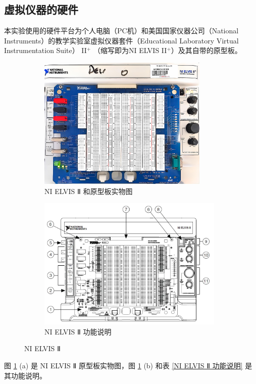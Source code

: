 \documentclass[UTF8]{article}
\theoremstyle{MyLineTheoremStyle} %
\theoremstyle{MyBlockTheoremStyle} %
\theoremstyle{MySubsubsectionStyle} %
\begin{document}
\subsection{虚拟仪器的硬件}
本实验使用的硬件平台为个人电脑（PC机）和美国国家仪器公司（National Instruments）的教学实验室虚拟仪器套件（Educational Laboratory Virtual Instrumentation Suite） II$ ^+ $ （缩写即为NI ELVIS II$ ^+ $）及其自带的原型板。
\begin{figure}[H]\centering
\begin{subfigure}[t]{0.47\columnwidth}\centering
    \includegraphics[height=180pt]{assets/NI ELVIS 2 和原型板实物图.jpg}
    \caption{ NI ELVIS Ⅱ 和原型板实物图 }
\end{subfigure}\hfill
\begin{subfigure}[t]{0.52\columnwidth}\centering
    \includegraphics[height=180pt]{assets/功能说明.png}
    \caption{ NI ELVIS Ⅱ 功能说明 }
\end{subfigure}
\caption{ NI ELVIS Ⅱ }
\label{NI ELVIS Ⅱ}
\end{figure}
图 \ref{NI ELVIS Ⅱ} (a) 是 NI ELVIS Ⅱ 原型板实物图，图 \ref{NI ELVIS Ⅱ} (b) 和表 \ref{NI ELVIS Ⅱ 功能说明} 是其功能说明。
\end{document}

